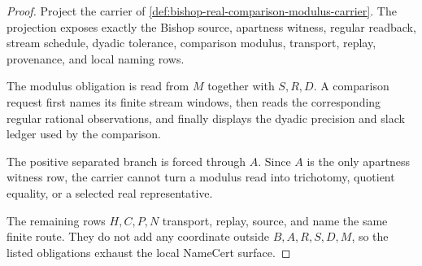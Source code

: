 \begin{proof}
Project the carrier of \autoref{def:bishop-real-comparison-modulus-carrier}. The projection exposes exactly the Bishop source, apartness witness, regular readback, stream schedule, dyadic tolerance, comparison modulus, transport, replay, provenance, and local naming rows.

The modulus obligation is read from $M$ together with $S,R,D$. A comparison request first names its finite stream windows, then reads the corresponding regular rational observations, and finally displays the dyadic precision and slack ledger used by the comparison.

The positive separated branch is forced through $A$. Since $A$ is the only apartness witness row, the carrier cannot turn a modulus read into trichotomy, quotient equality, or a selected real representative.

The remaining rows $H,C,P,N$ transport, replay, source, and name the same finite route. They do not add any coordinate outside $B,A,R,S,D,M$, so the listed obligations exhaust the local NameCert surface.
\end{proof}


\begin{closurestatus}{\BishopRealComparisonModulusUp}
  \theoryclosure{\seedClosure}
  \formalstatus{\unformalizedV}
\end{closurestatus}
